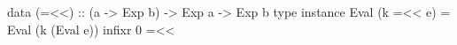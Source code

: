 \begin{code}
data (=<<)
    :: (a -> Exp b)
    -> Exp a
    -> Exp b
type instance Eval (k =<< e) =
  Eval (k (Eval e))
infixr 0 =<<
\end{code}
